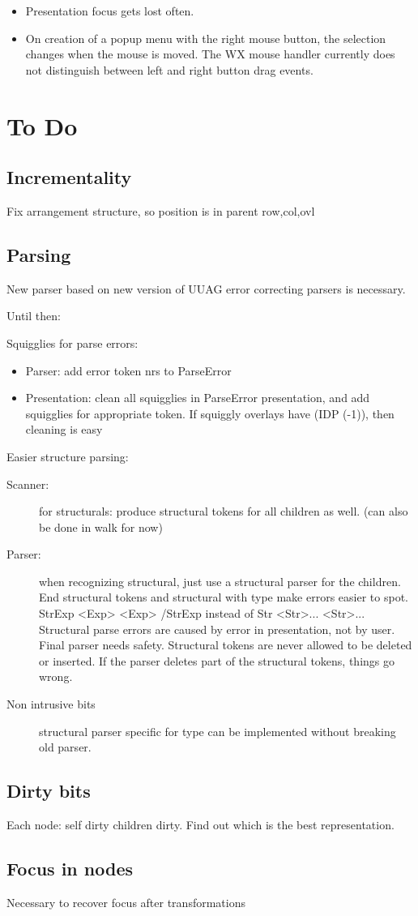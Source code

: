 \documentclass[]{article}
\begin{document}
\begin{itemize}
\item Presentation focus gets lost often.
\item On creation of a popup menu with the right mouse button, the selection changes when the mouse is moved. The WX mouse handler currently does not distinguish between left and right button drag events.
\end{itemize}


\section{To Do}
\subsection{Incrementality}
Fix arrangement structure, so position is in parent row,col,ovl
\subsection{Parsing}
New parser based on new version of UUAG error correcting parsers is necessary.

Until then:

Squigglies for parse errors:
\begin{itemize}
\item Parser: add error token nrs to ParseError
\item Presentation: clean all squigglies in ParseError presentation, and add squigglies for appropriate token. If squiggly overlays have (IDP (-1)), then cleaning is easy
\end{itemize}

Easier structure parsing:
\begin{description}
\item[Scanner:] for structurals: produce structural tokens for all children as well. (can also be done in walk for now)
\item[Parser:] when recognizing structural, just use a structural parser for the children. End structural tokens and structural with type make errors easier to spot. StrExp <Exp> <Exp> /StrExp instead of Str <Str>... <Str>... Structural parse errors are caused by error in presentation, not by user. Final parser needs safety. Structural tokens are never allowed to be deleted or inserted. If the parser deletes part of the structural tokens, things go wrong.
\item[Non intrusive bits] structural parser specific for type can be implemented without breaking old parser.
\end{description}

\subsection{Dirty bits}
Each node: self dirty children dirty. Find out which is the best representation.

\subsection{Focus in nodes}
Necessary to recover focus after transformations
\end{document}
